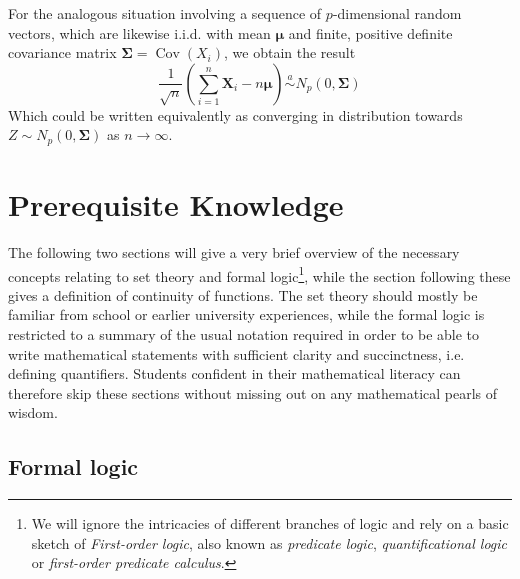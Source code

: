 \documentclass[12pt]{article}
\DeclareMathOperator{\Cov}{Cov}
\begin{document}
For the analogous situation involving a sequence of $p$-dimensional random vectors, which are likewise i.i.d. with mean $\boldsymbol{\mu}$ and finite, positive definite covariance matrix $\boldsymbol{\Sigma} = \Cov{(X_i)}$, we obtain the result
\[
\frac{1}{\sqrt{n}}\left(\sum_{i = 1}^n \boldsymbol{X}_i - n\boldsymbol{\mu}\right) \overset{a}\sim N_p(0, \boldsymbol{\Sigma})
\]
Which could be written equivalently as converging in distribution towards $Z \sim N_p(0, \boldsymbol{\Sigma})$ as $n \to \infty$.

\newpage
\appendix

\section{Prerequisite Knowledge}
The following two sections will give a very brief overview of the necessary concepts relating to set theory and formal logic\footnote{We will ignore the intricacies of different branches of logic and rely on a basic sketch of\textit{ First-order logic}, also known as \textit{predicate logic}, \textit{quantificational logic} or \textit{first-order predicate calculus}.}, while the section following these gives a definition of continuity of functions. The set theory should mostly be familiar from school or earlier university experiences, while the formal logic is restricted to a summary of the usual notation required in order to be able to write mathematical statements with sufficient clarity and succinctness, i.e. defining quantifiers. Students confident in their mathematical literacy can therefore skip these sections without missing out on any mathematical pearls of wisdom.
\subsection{Formal logic}
\end{document}
